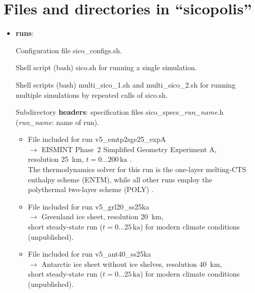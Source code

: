 \documentclass[12pt,a4paper]{article}
\begin{document}
\section{Files and directories in ``sicopolis''}

\begin{itemize}

\item \textbf{runs}:

Configuration file sico\_configs.sh.

Shell script (bash) sico.sh for running a single simulation.

Shell scripts (bash) multi\_sico\_1.sh and multi\_sico\_2.sh for running multiple simulations by repeated calls of sico.sh.

Subdirectory \textbf{headers}: specification files sico\_specs\_\emph{run\_name}.h (\emph{run\_name}: name of run).

\begin{itemize}

\item
File included for run v5\_emtp2sge25\_expA
\\
$\longrightarrow$ EISMINT Phase~2 Simplified Geometry Experiment A,
\\
\phantom{$\longrightarrow$} resolution 25~km, $t=0\ldots{}200\,\mathrm{ka}$ \citep{payne_etal_2000}.
\\
\phantom{$\longrightarrow$} The thermodynamics solver for this run is the one-layer melting-CTS
\\
\phantom{$\longrightarrow$} enthalpy scheme (ENTM), while all other runs employ the 
\\
\phantom{$\longrightarrow$} polythermal two-layer scheme (POLY) \citep{greve_blatter_2016}.

\item
File included for run v5\_grl20\_ss25ka
\\
$\longrightarrow$ Greenland ice sheet, resolution 20~km,
\\
\phantom{$\longrightarrow$} short steady-state run ($t=0\ldots{}25\,\mathrm{ka}$) for modern climate conditions
\\
\phantom{$\longrightarrow$} (unpublished).

\item
File included for run v5\_ant40\_ss25ka
\\
$\longrightarrow$ Antarctic ice sheet without ice shelves, resolution 40~km,
\\
\phantom{$\longrightarrow$} short steady-state run ($t=0\ldots{}25\,\mathrm{ka}$) for modern climate conditions
\\
\phantom{$\longrightarrow$} (unpublished).


\end{itemize}
\end{itemize}
\end{document}

